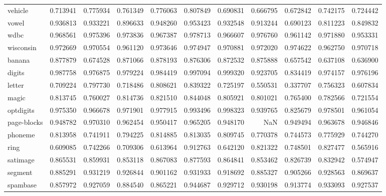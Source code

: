 \begin{tabular}{lrrrrrrrrrr}
vehicle         &   0.713941 &  0.775934 &  0.761349 &  0.776063 &  0.807849 &  0.690831 &  0.666795 &  0.672842 &  0.742175 &  0.724442 \\
vowel           &   0.936813 &  0.933221 &  0.896633 &  0.948260 &  0.953423 &  0.932548 &  0.913244 &  0.690123 &  0.811223 &  0.849832 \\
wdbc            &   0.968561 &  0.975396 &  0.973836 &  0.967387 &  0.978713 &  0.966607 &  0.976760 &  0.961142 &  0.971880 &  0.953331 \\
wisconsin       &   0.972669 &  0.970554 &  0.961120 &  0.973646 &  0.974947 &  0.970881 &  0.972020 &  0.974622 &  0.962750 &  0.970718 \\
banana          &   0.877879 &  0.674528 &  0.871066 &  0.878193 &  0.876306 &  0.872532 &  0.875888 &  0.657542 &  0.637108 &  0.636900 \\
digits          &   0.987758 &  0.976875 &  0.979224 &  0.984419 &  0.997094 &  0.999320 &  0.923705 &  0.834419 &  0.974157 &  0.976196 \\
letter          &   0.709224 &  0.797730 &  0.718486 &  0.808621 &  0.839322 &  0.725197 &  0.550531 &  0.337707 &  0.756323 &  0.607834 \\
magic           &   0.813745 &  0.760027 &  0.814736 &  0.821510 &  0.844048 &  0.805921 &  0.801021 &  0.765400 &  0.782566 &  0.721554 \\
optdigits       &   0.975350 &  0.966678 &  0.971901 &  0.977915 &  0.993496 &  0.998323 &  0.939765 &  0.825679 &  0.978501 &  0.961054 \\
page-blocks     &   0.948782 &  0.970310 &  0.962454 &  0.950417 &  0.965205 &  0.948170 &       NaN &  0.949494 &  0.963678 &  0.946846 \\
phoneme         &   0.813958 &  0.741911 &  0.794225 &  0.814885 &  0.813035 &  0.809745 &  0.770378 &  0.744573 &  0.775929 &  0.744270 \\
ring            &   0.609085 &  0.742266 &  0.709306 &  0.613964 &  0.912763 &  0.642120 &  0.821322 &  0.748501 &  0.827477 &  0.565916 \\
satimage        &   0.865531 &  0.859931 &  0.853118 &  0.867083 &  0.877593 &  0.864841 &  0.853462 &  0.826739 &  0.832942 &  0.574947 \\
segment         &   0.885291 &  0.931219 &  0.926844 &  0.901162 &  0.931933 &  0.918692 &  0.885327 &  0.905266 &  0.928563 &  0.869637 \\
spambase        &   0.857972 &  0.927059 &  0.884540 &  0.865221 &  0.944687 &  0.929712 &  0.930198 &  0.913774 &  0.933093 &  0.927537 \\

\end{tabular}

